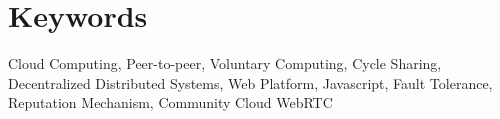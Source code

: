\section*{Keywords}

{\large
    \noindent Cloud Computing,
    \noindent Peer-to-peer,
    \noindent Voluntary Computing,
    \noindent Cycle Sharing,
    \noindent Decentralized Distributed Systems,
    \noindent Web Platform,
    \noindent Javascript,
    \noindent Fault Tolerance,
    \noindent Reputation Mechanism,
    \noindent Community Cloud
    \noindent WebRTC
}


\cleardoublepage
\pagestyle{plain}
\def\contentsname{Index}
\tableofcontents
\newpage
\listoffigures
\newpage
\listoftables
\cleardoublepage
